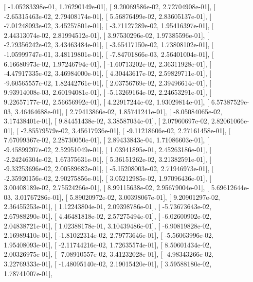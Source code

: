 \documentclass{article}
\begin{document}
       [ -1.05283398e-01,   1.76290149e-01],
       [  9.20069586e-02,   2.72704908e-01],
       [ -2.65315463e-02,   2.79408174e-01],
       [  5.56876499e-02,   2.83605137e-01],
       [ -7.01248093e-02,   3.45257801e-01],
       [ -3.71127289e-02,   1.95416397e-01],
       [  2.44313074e-02,   2.81994512e-01],
       [  3.97530296e-02,   1.97385596e-01],
       [ -2.79356242e-02,   3.43463484e-01],
       [ -3.65417150e-02,   1.73808102e-01],
       [ -1.05999747e-01,   3.48119801e-01],
       [ -7.84701866e-03,   2.56401004e-01],
       [  6.16680973e-02,   1.97246794e-01],
       [ -1.60713202e-02,   2.36311928e-01],
       [ -4.47917335e-02,   3.46984000e-01],
       [  4.30443617e-02,   2.59829711e-01],
       [ -9.60565557e-02,   1.82442761e-01],
       [  2.03756769e-02,   2.39496614e-01],
       [  9.93914008e-03,   2.60194081e-01],
       [ -5.13269164e-02,   2.24653291e-01],
       [  9.22657177e-02,   2.56656992e-01],
       [  4.22917244e-02,   1.93029814e-01],
       [  6.57387529e-03,   3.46464688e-01],
       [  2.79413866e-02,   1.85741241e-01],
       [ -8.05084065e-02,   3.17438401e-01],
       [  9.84451438e-02,   3.38587034e-01],
       [  2.07960697e-02,   2.82061066e-01],
       [ -2.85579579e-02,   3.45617936e-01],
       [ -9.11218606e-02,   2.27161458e-01],
       [  7.67099367e-02,   2.28730050e-01],
       [  2.89433843e-04,   1.71086603e-01],
       [ -9.45899207e-02,   2.52951049e-01],
       [  1.03941895e-01,   2.45263186e-01],
       [ -2.24246304e-02,   1.67375631e-01],
       [  5.36151262e-02,   3.21382591e-01],
       [ -9.33253696e-02,   2.00589682e-01],
       [ -5.15208003e-02,   2.71946973e-01],
       [ -2.35920156e-02,   2.90275856e-01],
       [  3.05212985e-02,   1.97096436e-01],
       [  3.00408189e-02,   2.75524266e-01],
       [  8.99115638e-02,   2.95679004e-01],
       [  5.69612644e-03,   3.01767286e-01],
       [  5.89020972e-02,   3.00398067e-01],
       [  9.20901297e-02,   2.36455253e-01],
       [  1.12243804e-01,   2.09398786e-01],
       [ -5.73673643e-02,   2.67988290e-01],
       [  4.46481818e-02,   2.57275494e-01],
       [ -6.02600902e-02,   2.04838721e-01],
       [  1.02388178e-01,   3.10439486e-01],
       [ -6.90819828e-02,   2.16989410e-01],
       [ -1.81022314e-02,   2.79773646e-01],
       [ -5.56063996e-02,   1.95408093e-01],
       [ -2.11744216e-02,   1.72635574e-01],
       [  8.50601434e-02,   2.00326975e-01],
       [ -7.08910557e-02,   3.41232028e-01],
       [ -4.98343266e-02,   3.22769333e-01],
       [ -1.48095140e-02,   2.19015420e-01],
       [  3.59588180e-02,   1.78741007e-01],
\end{document}
